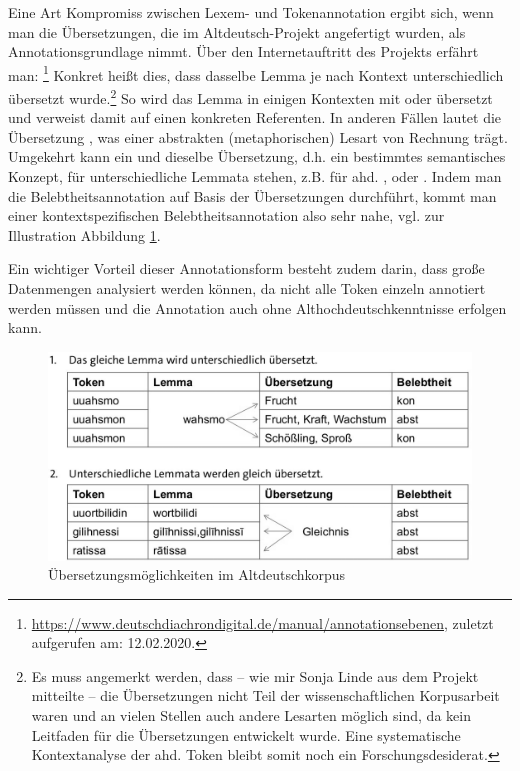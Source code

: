 Eine Art Kompromiss zwischen Lexem- und Tokenannotation ergibt sich, wenn man die Übersetzungen, die im Altdeutsch-Projekt angefertigt wurden, als Annotationsgrundlage nimmt.  
Über den Internetauftritt des Projekts erfährt man: \footnote{\url{https://www.deutschdiachrondigital.de/manual/annotationsebenen}, zuletzt aufgerufen am: 12.02.2020.} Konkret heißt dies, dass dasselbe Lemma je nach Kontext unterschiedlich übersetzt wurde.\footnote{Es muss angemerkt werden, dass -- wie mir Sonja Linde aus dem Projekt mitteilte -- die Übersetzungen nicht Teil der wissenschaftlichen Korpusarbeit waren und an vielen Stellen auch andere Lesarten möglich sind, da kein Leitfaden für die Übersetzungen entwickelt wurde. Eine systematische Kontextanalyse der ahd. Token bleibt somit noch ein Forschungsdesiderat.} So wird das Lemma  in einigen Kontexten mit  oder  übersetzt und verweist damit auf einen konkreten Referenten. In anderen Fällen lautet die Übersetzung , was einer  abstrakten (metaphorischen) Lesart von  Rechnung trägt. Umgekehrt kann ein und dieselbe Übersetzung, d.h. ein bestimmtes semantisches Konzept, für unterschiedliche Lemmata stehen, z.B.  für ahd. ,  oder . Indem man die Belebtheitsannotation auf Basis der Übersetzungen durchführt, kommt man einer kontextspezifischen Belebtheitsannotation also sehr nahe, vgl. zur Illustration Abbildung \ref{abb:konzept-ddd}. 

Ein wichtiger Vorteil dieser Annotationsform besteht zudem darin, dass große Datenmengen analysiert werden können, da nicht alle Token einzeln annotiert werden müssen und die Annotation auch ohne Althochdeutschkenntnisse erfolgen kann.


\begin{figure}[h]
\begin{center}
  \includegraphics[width=10 cm]{images/konzept-ddd-sw.jpg}
\caption {Übersetzungsmöglichkeiten im Altdeutschkorpus}
\label{abb:konzept-ddd}
\end{center}
\end{figure} 
 

